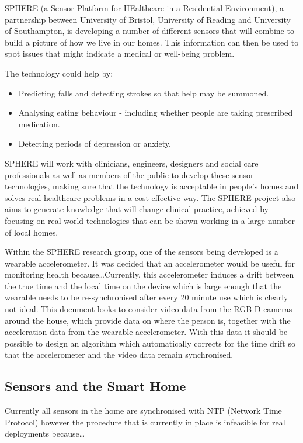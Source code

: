 \href{http://www.irc-sphere.ac.uk/}{SPHERE (a Sensor Platform for HEalthcare in a Residential Environment)}, a partnership between University of Bristol, University of Reading and University of Southampton, is developing a number of different sensors that will combine to build a picture of how we live in our homes. This information can then be used to spot issues that might indicate a medical or well-being problem.

The technology could help by:
\begin{itemize}
    \item Predicting falls and detecting strokes so that help may be summoned.
    \item Analysing eating behaviour - including whether people are taking prescribed medication.
    \item Detecting periods of depression or anxiety.
\end{itemize}
\cite{sphere_website}

SPHERE will work with clinicians, engineers, designers and social care professionals as well as members of the public to develop these sensor technologies, making sure that the technology is acceptable in people's homes and solves real healthcare problems in a cost effective way. The SPHERE project also aims to generate knowledge that will change clinical practice, achieved by focusing on real-world technologies that can be shown working in a large number of local homes.

Within the SPHERE research group, one of the sensors being developed is a wearable accelerometer. It was decided that an accelerometer would be useful for monitoring health because\ldots Currently, this accelerometer induces a drift between the true time and the local time on the device which is large enough that the wearable needs to be re-synchronised after every 20 minute use which is clearly not ideal. This document looks to consider video data from the RGB-D cameras around the house, which provide data on where the person is, together with the acceleration data from the wearable accelerometer. With this data it should be possible to design an algorithm which automatically corrects for the time drift so that the accelerometer and the video data remain synchronised.

\subsection{Sensors and the Smart Home} 
Currently all sensors in the home are synchronised with NTP (Network Time Protocol) however the procedure that is currently in place is infeasible for real deployments because\ldots
 
